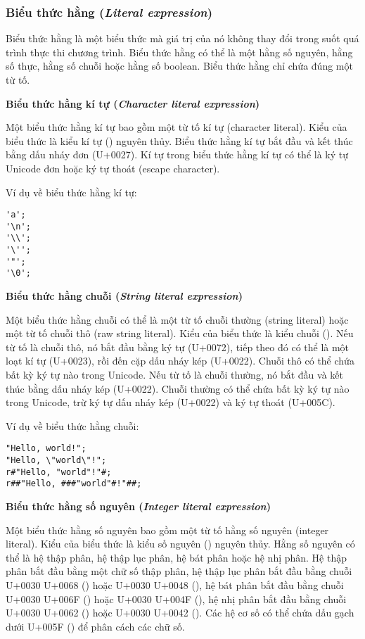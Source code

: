 \subsubsection{Biểu thức hằng (\textit{Literal expression})}

    Biểu thức hằng là một biểu thức mà giá trị của nó không thay đổi trong suốt quá trình thực thi chương trình. Biểu thức hằng có thể là một hằng số nguyên, hằng số thực, hằng số chuỗi hoặc hằng số boolean. Biểu thức hằng chỉ chứa đúng một từ tố.

\regexlitexpr

\noindent\textbf{Biểu thức hằng kí tự (\textit{Character literal expression})}

    Một biểu thức hằng kí tự bao gồm một từ tố kí tự (character literal). Kiểu của biểu thức là kiểu kí tự () nguyên thủy. Biểu thức hằng kí tự bắt đầu và kết thúc bằng dấu nháy đơn  (U+0027). Kí tự trong biểu thức hằng kí tự có thể là ký tự Unicode đơn hoặc ký tự thoát (escape character). 

\noindent Ví dụ về biểu thức hằng kí tự:
\begin{lstlisting}[]
'a';
'\n';
'\\';
'\'';
'"';
'\0';
\end{lstlisting}

\noindent\textbf{Biểu thức hằng chuỗi (\textit{String literal expression})}

    Một biểu thức hằng chuỗi có thể là một từ tố chuỗi thường (string literal) hoặc một từ tố chuỗi thô (raw string literal). Kiểu của biểu thức là kiểu chuỗi (). Nếu từ tố là chuỗi thô, nó bắt đầu bằng ký tự  (U+0072), tiếp theo đó có thể là một loạt kí tự \kw{\#} (U+0023), rồi đến cặp dấu nháy kép  (U+0022). Chuỗi thô có thể chứa bất kỳ ký tự nào trong Unicode. Nếu từ tố là chuỗi thường, nó bắt đầu và kết thúc bằng dấu nháy kép  (U+0022). Chuỗi thường có thể chứa bất kỳ ký tự nào trong Unicode, trừ ký tự dấu nháy kép (U+0022) và ký tự thoát (U+005C).

\noindent Ví dụ về biểu thức hằng chuỗi:
\begin{lstlisting}[]
"Hello, world!";
"Hello, \"world\"!";
r#"Hello, "world"!"#;
r##"Hello, ###"world"#!"##;
\end{lstlisting}

\noindent\textbf{Biểu thức hằng số nguyên (\textit{Integer literal expression})}

    Một biểu thức hằng số nguyên bao gồm một từ tố hằng số nguyên (integer literal). Kiểu của biểu thức là kiểu số nguyên () nguyên thủy. Hằng số nguyên có thể là hệ thập phân, hệ thập lục phân, hệ bát phân hoặc hệ nhị phân. Hệ thập phân bắt đầu bằng một chữ số thập phân, hệ thập lục phân bắt đầu bằng chuỗi U+0030 U+0068 () hoặc U+0030 U+0048 (), hệ bát phân bắt đầu bằng chuỗi U+0030 U+006F () hoặc U+0030 U+004F (), hệ nhị phân bắt đầu bằng chuỗi U+0030 U+0062 () hoặc U+0030 U+0042 (). Các hệ cơ số có thể chứa dấu gạch dưới U+005F (\kw{\_}) để phân cách các chữ số.

